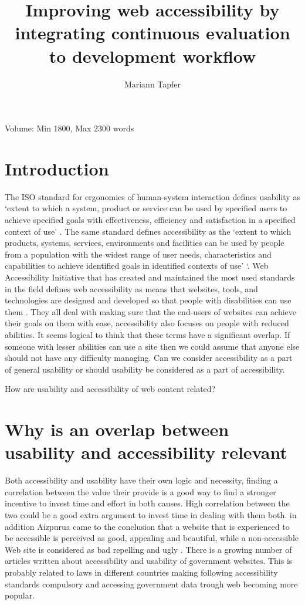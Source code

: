 \documentclass{thesis_proposal}
\title{Improving web accessibility by integrating continuous evaluation to development workflow}
\author{Mariann Tapfer}
\begin{document}
\maketitle
Volume:  Min 1800, Max 2300 words

\section{Introduction}
The ISO standard for ergonomics of human-system interaction defines usability as `extent to which a system, product or service can be used by specified users to achieve specified goals with effectiveness, efficiency and satisfaction in a specified context of use' \citep{ISO_2019}. The same standard defines accessibility as the `extent to which products, systems, services, environments and facilities can be used by people from a population with the widest range of user needs, characteristics and capabilities to achieve identified goals in identified contexts of use' \citep{ISO_2019}`. Web Accessibility Initiative that has created and maintained the most used standards in the field defines web accessibility  as means that websites, tools, and technologies are designed and developed so that people with disabilities can use them \citep{WAI_introduction_2022}.
They all deal with making sure that the end-users of websites can achieve their goals on them with ease, accessibility also focuses on people with reduced abilities.
It seems logical to think that these terms have a significant overlap. If someone with lesser abilities can use a site then we could assume that anyone else should not have any difficulty managing. Can we consider accessibility as a part of general usability or should usability be considered as a part of accessibility.
\begin{RQlist}
	\item How are usability and accessibility of web content related?
\end{RQlist}

\section{Why is an overlap between usability and accessibility relevant}

Both accessibility and usability have their own logic and necessity, finding a correlation between the value their provide is a good way to find a stronger incentive to invest time and effort in both causes. High correlation between the two could be a good extra argument to invest time in dealing with them both.
in addition Aizpurua came to the conclusion that a website that is experienced to be accessible is perceived as good, appealing and beautiful, while a non-accessible Web site is considered as bad repelling and ugly \citep{aizpurua_exploring_2016}.
There is a growing number of articles written about accessibility and usability of government websites. This is probably related to laws in different countries making following accessibility standards compulsory and accessing government data trough web becoming more popular.
\end{document}
